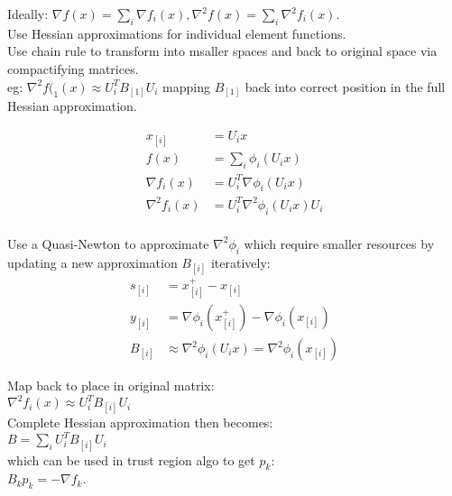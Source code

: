\documentclass[8pt,letter]{article}
\begin{document}
\begin{multicols*}{2}
  Ideally: $\nabla f(x) = \sum_i \nabla f_i(x), \nabla^2 f(x) = \sum_i \nabla^2 f_i(x)$.\\

  Use Hessian approximations for individual element functions.\\

  Use chain rule to transform into msaller spaces and back to original space via compactifying matrices.\\

  eg: $\nabla^2 f(_1(x) \approx U_i^T B_{[1]} U_i$ mapping $B_{[1]}$ back into correct position in the full Hessian approximation.

  \begin{align*}
    x_{[i]} &= U_i x\\
    f(x) &= \sum_i \phi_i(U_i x)\\
    \nabla f_i(x) &= U_i^T \nabla \phi_i(U_i x)\\
    \nabla^2 f_i(x) &= U_i^T \nabla^2 \phi_i(U_i x) U_i\\
  \end{align*}

  Use a Quasi-Newton to approximate $\nabla^2 \phi_i$ which require smaller resources by updating a new approximation $B_{[i]}$ iteratively:
  \begin{align*}
    s_{[i]} & = x_{[i]}^+ - x_{[i]}\\
    y_{[i]} & = \nabla \phi_i(x_{[i]}^+) - \nabla \phi_i(x_{[i]})\\
    B_{[i]} & \approx \nabla^2 \phi_i(U_i x) = \nabla^2 \phi_i(x_{[i]})
  \end{align*}

  Map back to place in original matrix:\\

  $\nabla^2 f_i(x) \approx U_i^T B_{[i]} U_i$\\

  Complete Hessian approximation then becomes:\\

  $B = \sum_i U_i^T B_{[i]} U_i$\\

  which can be used in trust region algo to get $p_k$:\\
  
  $B_k p_k = -\nabla f_k$.
  
  \end{multicols*}
\end{document}
